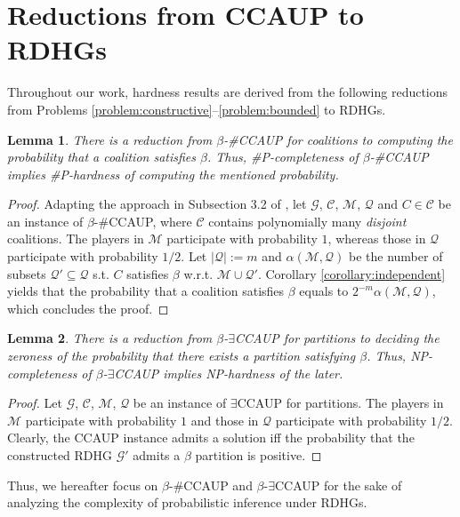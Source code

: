 \documentclass[letterpaper]{article}
\newtheorem{lemma}{Lemma}
\begin{document}
\section{Reductions from CCAUP to RDHGs}
Throughout our work, hardness results are derived from the following reductions from Problems \ref{problem:constructive}--\ref{problem:bounded} to RDHGs.
\begin{lemma}
\label{lemma:connection coalitions}
There is a reduction from $\beta$-\#CCAUP for coalitions to computing the probability that a coalition satisfies $\beta$. Thus, \#P-completeness of $\beta$-\#CCAUP implies \#P-hardness of computing the mentioned probability.
\end{lemma}
\begin{proof}
Adapting the approach in Subsection 3.2 of \cite{imber2021probabilistic}, let $\mathcal{G}$, $\mathcal{C}$, $\mathcal{M}$, $\mathcal{Q}$ and $C \in \mathcal{C}$ be an instance of $\beta$-\#CCAUP, where $\mathcal{C}$ contains polynomially many \textit{disjoint} coalitions. The players in $\mathcal{M}$ participate with probability $1$, whereas those in $\mathcal{Q}$ participate with probability $1/2$. Let $|\mathcal{Q}| := m$ and $\alpha(\mathcal{M}, \mathcal{Q})$ be the number of subsets $\mathcal{Q}' \subseteq \mathcal{Q}$ s.t. $C$ satisfies $\beta$ w.r.t. $\mathcal{M} \cup \mathcal{Q}'$. Corollary \ref{corollary:independent} yields that the probability that a coalition satisfies $\beta$ equals to $2^{-m} \alpha(\mathcal{M}, \mathcal{Q})$, which concludes the proof.
\end{proof}

\begin{lemma}
\label{lemma:connection partitions}
There is a reduction from $\beta$-$\exists$CCAUP for partitions to deciding the zeroness of the probability that there exists a partition satisfying $\beta$. Thus, NP-completeness of $\beta$-$\exists$CCAUP implies NP-hardness of the later.
\end{lemma}
\begin{proof}
Let $\mathcal{G}$, $\mathcal{C}$, $\mathcal{M}$, $\mathcal{Q}$ be an instance of $\exists$CCAUP for partitions. The players in $\mathcal{M}$ participate with probability $1$ and those in $\mathcal{Q}$ participate with probability $1/2$. Clearly, the CCAUP instance admits a solution iff the probability that the constructed RDHG $\mathcal{G}'$ admits a $\beta$ partition is positive.
\end{proof}

Thus, we hereafter focus on $\beta$-\#CCAUP and $\beta$-$\exists$CCAUP for the sake of analyzing the complexity of probabilistic inference under RDHGs.
\end{document}
